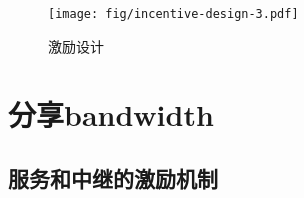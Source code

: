 \begin{figure}[htbp]
\centering
\texttt{[image: fig/incentive-design-3.pdf]}
\caption[激励设计\statusgreen]{激励设计}
\label{fig:incentives}
\end{figure}




\section{分享bandwidth\statusgreen}

\green{}

\subsection{服务和中继的激励机制\statusgreen}\label{sec:incentives-relaying}

